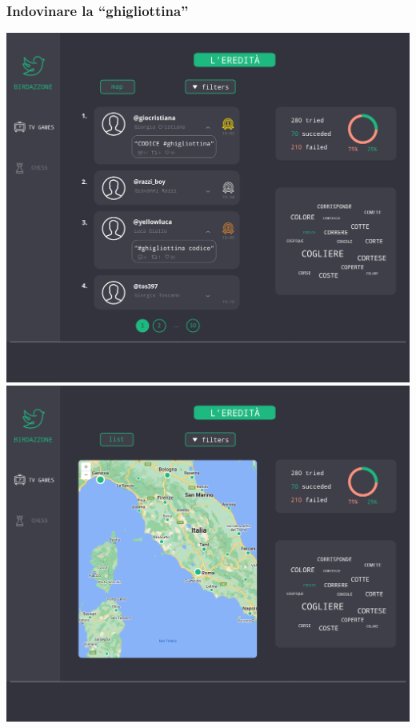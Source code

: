 \documentclass{article}
\begin{document}
\subsubsection{Indovinare la ``ghigliottina''}

\includegraphics[width=\textwidth]{mock-ghigliottina-tweet-list.png}
\includegraphics[width=\textwidth]{mock-ghigliottina-map.png}
\end{document}

